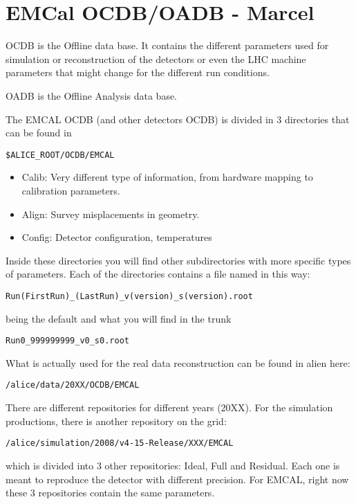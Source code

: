 
\section{EMCal OCDB/OADB - Marcel}

OCDB is the Offline data base. It contains the different parameters used for simulation or reconstruction of the detectors or even the LHC machine parameters that might change for the different run conditions.

OADB is the Offline Analysis data base.

The EMCAL OCDB (and other detectors OCDB) is divided in 3 directories that can be found in 
\begin{lstlisting}
$ALICE_ROOT/OCDB/EMCAL
\end{lstlisting}
\begin{itemize}
\item Calib: Very different type of information, from hardware mapping to calibration parameters. 
\item Align: Survey misplacements in geometry.
\item Config: Detector configuration, temperatures
\end{itemize}

Inside these directories you will find other subdirectories with more specific types of parameters. Each of the directories contains a file named in this way:
\begin{lstlisting}
Run(FirstRun)_(LastRun)_v(version)_s(version).root
\end{lstlisting}
being the default and what you will find in the trunk
\begin{lstlisting}
Run0_999999999_v0_s0.root
\end{lstlisting}

What is actually used for the real data reconstruction can be found in alien here:
\begin{lstlisting}
/alice/data/20XX/OCDB/EMCAL
\end{lstlisting}
There are different repositories for different years (20XX). For the simulation productions, there is another repository on the grid:
\begin{lstlisting}
/alice/simulation/2008/v4-15-Release/XXX/EMCAL
\end{lstlisting}
which is divided into 3 other repositories: Ideal, Full and Residual. Each one is meant to reproduce the detector with different precision. For EMCAL, right now these 3 repositories contain the same parameters.

